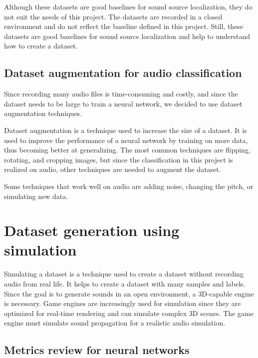 Although these datasets are good baselines for sound source localization, they do not suit the needs of this project. The datasets are recorded in a closed environment and do not reflect the baseline defined in this project. Still, these datasets are good baselines for sound source localization and help to understand how to create a dataset.

\subsection{Dataset augmentation for audio classification}
Since recording many audio files is time-consuming and costly, and since the dataset needs to be large to train a neural network, we decided to use dataset augmentation techniques.

Dataset augmentation is a technique used to increase the size of a dataset. It is used to improve the performance of a neural network by training on more data, thus becoming better at generalizing. The most common techniques are flipping, rotating, and cropping images, but since the classification in this project is realized on audio, other techniques are needed to augment the dataset. 

Some techniques that work well on audio are adding noise, changing the pitch, or simulating new data. 

\section{Dataset generation using simulation}
\label{sec:dataset_generation_simulation}

Simulating a dataset is a technique used to create a dataset without recording audio from real life. It helps to create a dataset with many samples and labels. Since the goal is to generate sounds in an open environment, a 3D-capable engine is necessary. Game engines are increasingly used for simulation since they are optimized for real-time rendering and can simulate complex 3D scenes. The game engine must simulate sound propagation for a realistic audio simulation.






\subsection{Metrics review for neural networks}


